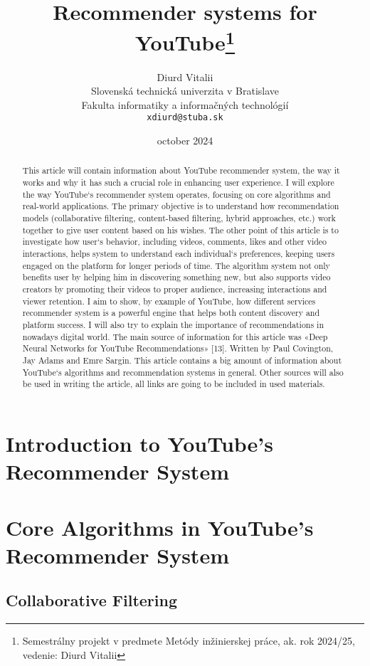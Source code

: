\documentclass[10pt,twoside,slovak,a4paper]{coursepaper}
\title{Recommender systems for YouTube\thanks{Semestrálny projekt v predmete Metódy inžinierskej práce, ak. rok 2024/25, vedenie: Diurd Vitalii}}
\author{Diurd Vitalii\\[2pt]
	{\small Slovenská technická univerzita v Bratislave}\\
	{\small Fakulta informatiky a informačných technológií}\\
	{\small \texttt{xdiurd@stuba.sk}}
	}
\date{\small october 2024} %
\begin{document}
\maketitle

\begin{abstract}
This article will contain information about YouTube recommender system, the way it works and why it has such a crucial role in enhancing user experience. I will explore the way YouTube`s recommender system operates, focusing on core algorithms and real-world applications. The primary objective is to understand how recommendation models (collaborative filtering, content-based filtering, hybrid approaches, etc.) work together to give user content based on his wishes. The other point of this article is to investigate how user`s behavior, including videos, comments, likes and other video interactions, helps system to understand each individual`s preferences, keeping users engaged on the platform for longer periods of time. The algorithm system not only benefits user by helping him in discovering something new, but also supports video creators by promoting their videos to proper audience, increasing interactions and viewer retention. I aim to show, by example of YouTube,   how different services recommender system is a powerful engine that helps both content discovery and platform success. I will also try to explain the importance of recommendations in nowadays digital world. The main source of information for this article was «Deep Neural Networks for YouTube Recommendations» [13].  Written by Paul Covington, Jay Adams and Emre Sargin. This article contains a big amount of information about YouTube`s algorithms and recommendation systems in general. Other sources will also be used in writing the article, all links are going to be included in used materials.
\end{abstract}



\section{Introduction to YouTube’s Recommender System} \label{intro}
\section{Core Algorithms in YouTube’s Recommender System} \label{core}
\subsection{Collaborative Filtering} \label{core:collaborative}
\end{document}
